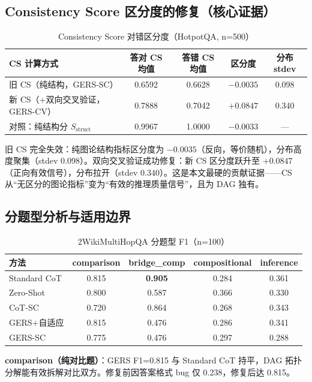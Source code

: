 \documentclass[11pt,a4paper]{ctexart}
\begin{document}
\subsection{Consistency Score 区分度的修复（核心证据）}

\begin{table}[h]
\centering
\caption{Consistency Score 对错区分度（HotpotQA, n=500）}
\begin{tabular}{lcccc}
\toprule
CS 计算方式 & 答对 CS 均值 & 答错 CS 均值 & 区分度 & 分布 stdev \\
\midrule
旧 CS（纯结构，GERS-SC） & 0.6592 & 0.6628 & $\mathbf{-0.0035}$ & 0.098 \\
新 CS（+双向交叉验证，GERS-CV） & 0.7888 & 0.7042 & $\mathbf{+0.0847}$ & 0.340 \\
对照：纯结构分 $S_{\text{struct}}$ & 0.9967 & 1.0000 & $-0.0033$ & — \\
\bottomrule
\end{tabular}
\end{table}

旧 CS 完全失效：纯图论结构指标区分度为 $-0.0035$（反向，等价随机），分布高度聚集（stdev 0.098）。双向交叉验证成功修复：新 CS 区分度跃升至 $+0.0847$（正向有效信号），分布拉开（stdev 0.340）。这是本文最硬的贡献证据——CS 从``无区分的图论指标''变为``有效的推理质量信号''，且为 DAG 独有。

\subsection{分题型分析与适用边界}

\begin{table}[h]
\centering
\caption{2WikiMultiHopQA 分题型 F1（n=100）}
\begin{tabular}{lcccc}
\toprule
方法 & comparison & bridge\_comp & compositional & inference \\
\midrule
Standard CoT & 0.815 & \textbf{0.905} & 0.284 & 0.361 \\
Zero-Shot & 0.800 & 0.587 & 0.366 & 0.330 \\
CoT-SC & 0.720 & 0.864 & 0.268 & 0.343 \\
GERS+自适应 & 0.815 & 0.476 & 0.286 & 0.341 \\
GERS-SC & 0.775 & 0.476 & 0.297 & 0.288 \\
\bottomrule
\end{tabular}
\end{table}

\textbf{comparison（纯对比题）}：GERS F1=0.815 与 Standard CoT 持平，DAG 拓扑分解能有效拆解对比双方。修复前因答案格式 bug 仅 0.238，修复后达 0.815。
\end{document}
